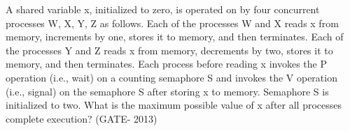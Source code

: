 \begin{questyle}
\begin{parts}
  \end{parts}

  \end{questyle}




\begin{questyle}

  \question  A shared variable x, initialized to zero, is operated on by four concurrent processes W, X, Y, Z as follows.
            Each of the processes W and X reads x from memory, increments by one, stores it to memory, and then terminates.
            Each of the processes Y and Z reads x from memory, decrements by two, stores it to memory, and then terminates.
            Each process before reading x invokes the P operation (i.e., wait) on a counting semaphore S and
            invokes the V operation (i.e., signal) on the semaphore S after storing x to memory.
            Semaphore S is initialized to two. What is the maximum possible value of x after all
            processes complete execution? (GATE- 2013)

  \begin{oneparchoices}
  \end{oneparchoices}

  \end{questyle}




